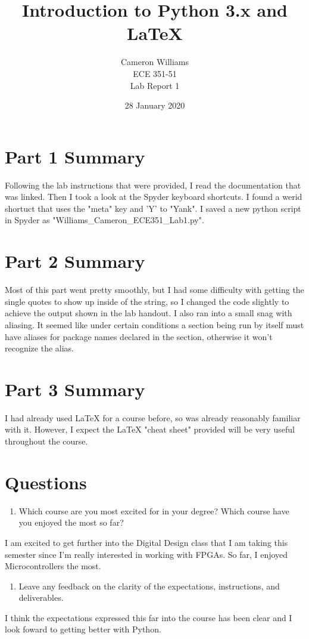 \documentclass[12pt]{article}
\title{Introduction to Python 3.x and LaTeX}
\author{Cameron Williams\\ECE 351-51\\Lab Report 1}
\date{28 January 2020}
\begin{document}
\vspace{\fill}
\maketitle
\vspace{\fill}
\clearpage

\newpage
\section{Part 1 Summary}
    \par Following the lab instructions that were provided, I read the documentation that was linked. Then I took a look at the Spyder keyboard shortcuts. I found a werid shortuct that uses the "meta" key and 'Y' to "Yank". I saved a new python script in Spyder as "Williams\_Cameron\_ECE351\_Lab1.py".
\section{Part 2 Summary}
    \par Most of this part went pretty smoothly, but I had some difficulty with getting the single quotes to show up inside of the string, so I changed the code slightly to achieve the output shown in the lab handout. I also ran into a small snag with aliasing. It seemed like under certain conditions a section being run by itself must have aliases for package names declared in the section, otherwise it won't recognize the alias.
\section{Part 3 Summary}
    \par I had already used LaTeX for a course before, so was already reasonably familiar with it. However, I expect the LaTeX "cheat sheet" provided will be very useful throughout the course.
\newpage
\section*{Questions}

\begin{enumerate}
    \item Which course are you most excited for in your degree? Which course have you enjoyed the most so far?
\end{enumerate}
    \par I am excited to get further into the Digital Design class that I am taking this semester since I'm really interested in working with FPGAs. So far, I enjoyed Microcontrollers the most.
\begin{enumerate}[resume]
    \item Leave any feedback on the clarity of the expectations, instructions, and deliverables.
\end{enumerate}
    \par I think the expectations expressed this far into the course has been clear and I look foward to getting better with Python.
    
\end{document}
